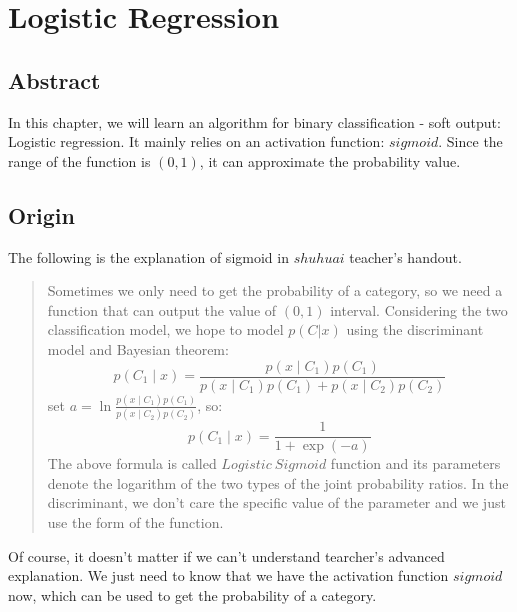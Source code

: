 \documentclass{report}
\begin{document}
\section{Logistic Regression}
\subsection{Abstract}
In this chapter, we will learn an algorithm for binary classification - soft output: Logistic regression. It mainly relies on an activation function: $sigmoid$. Since the range of the function is $(0,1)$, it can approximate the probability value.
\subsection{Origin}
The following is the explanation of sigmoid in $shuhuai$ teacher's handout.
\begin{quotation}
	Sometimes we only need to get the probability of a category, so we need a function that can output the value of $(0, 1)$ interval. Considering the two classification model, we hope to model $p(C|x)$ using the discriminant model and Bayesian theorem: $$p\left(C_{1} \mid x\right)=\frac{p\left(x \mid C_{1}\right) p\left(C_{1}\right)}{p\left(x \mid C_{1}\right) p\left(C_{1}\right)+p\left(x \mid C_{2}\right) p\left(C_{2}\right)}$$
	set $a=\ln \frac{p\left(x \mid C_{1}\right) p\left(C_{1}\right)}{p\left(x \mid C_{2}\right) p\left(C_{2}\right)}$, so:
$$
p\left(C_{1} \mid x\right)=\frac{1}{1+\exp (-a)}
$$
The above formula is called $Logistic\ Sigmoid$ function and its parameters denote the logarithm of the two types of the joint probability ratios. In the discriminant, we don't care the specific value of the parameter and we just use the form of the function.
\end{quotation}
Of course, it doesn't matter if we can't understand tearcher's advanced explanation. We just need to know that we have the activation function $sigmoid$ now, which can be used to get the probability of a category.
\end{document}
